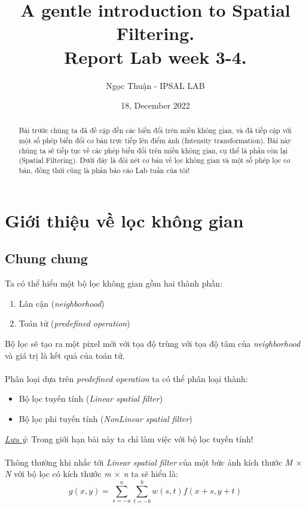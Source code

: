 \documentclass{article}
\title{A gentle introduction to Spatial Filtering. \\ \large Report Lab week 3-4.}
\author{Ngọc Thuận - IPSAL LAB}
\date{18, December 2022}
\begin{document}
\maketitle
\begin{abstract}
    Bài trước chúng ta đã đề cập đến các biến đổi trên miền không gian, và đã tiếp cập với một số phép biến đổi cơ bản trực tiếp lên điểm ảnh (Intensity transformation). Bài này chúng ta sẽ tiếp tục về các phép biến đổi trên miền không gian, cụ thể là phần còn lại (Spatial Filtering). Dưới đây là đôi nét cơ bản về lọc không gian và một số phép lọc cơ bản, đồng thời cũng là phần báo cáo Lab tuần của tôi!
\end{abstract}
\tableofcontents
\newpage
\section{Giới thiệu về lọc không gian}
    \subsection{Chung chung}
    Ta có thể hiểu một bộ lọc không gian gồm hai thành phần:
    \begin{enumerate}
        \item Lân cận (\textit{neighborhood})
        \item Toán tử (\textit{predefined operation})
        
    \end{enumerate}
    Bộ lọc sẽ tạo ra một pixel mới với tọa độ trùng với tọa độ tâm của \textit{neighborhood} và giá trị là kết quả của toán tử. \\ \\    
    Phân loại dựa trên \textit{predefined operation} ta có thể phân loại thành:
    \begin{itemize}
        \item Bộ lọc tuyến tính (\textit{Linear spatial filter})
        \item Bộ lọc phi tuyến tính (\textit{NonLinear spatial filter})
    \end{itemize}
    \underline{\textit{Lưu ý}}: Trong giới hạn bài này ta chỉ làm việc với bộ lọc tuyến tính!\\ \\
    Thông thường khi nhắc tới \textit{Linear spatial filter} của một bức ảnh kích thước \textit{M $\times$ N} với bộ lọc có kích thước \textit{m $\times$ n} ta sẽ hiểu là:
    \begin{equation}
    g(x,y) = \sum_{s=-a}^{a}\sum_{t=-b}^{b} w(s,t)f(x+s,y+t)
    \label{eq1}
    \end{equation}
\end{document}
